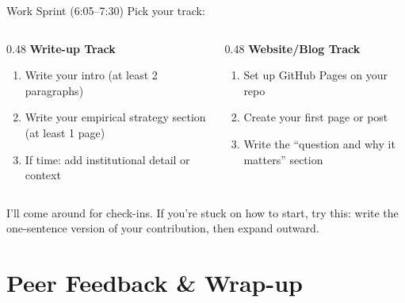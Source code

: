 \begin{frame}{Work Sprint (6:05--7:30)}
  Pick your track:

  \vspace{8pt}

  \begin{columns}[T]
    \begin{column}{0.48\textwidth}
      \textbf{\textcolor{usfgreen}{Write-up Track}}
      \begin{enumerate}
        \item Write your intro (at least 2 paragraphs)
        \item Write your empirical strategy section (at least 1 page)
        \item If time: add institutional detail or context
      \end{enumerate}
    \end{column}
    \begin{column}{0.48\textwidth}
      \textbf{\textcolor{usfgreen}{Website/Blog Track}}
      \begin{enumerate}
        \item Set up GitHub Pages on your repo
        \item Create your first page or post
        \item Write the ``question and why it matters'' section
      \end{enumerate}
    \end{column}
  \end{columns}

  \vspace{10pt}

  I'll come around for check-ins. If you're stuck on how to start, try this: write the one-sentence version of your contribution, then expand outward.
\end{frame}

\section{Peer Feedback \& Wrap-up}

